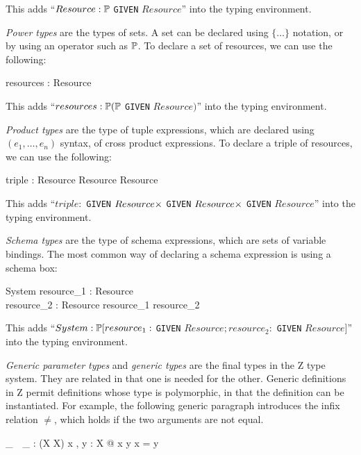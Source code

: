 This adds ``$Resource : \power$ {\tt GIVEN} $Resource$'' into the typing
environment.

{\em Power types} are the types of sets. A set can be declared using
$\{\ldots\}$ notation, or by using an operator such as $\power$. To
declare a set of resources, we can use the following:
\begin{axdef}
  resources : \power Resource
\end{axdef}

This adds ``$resources : \power (\power$ {\tt GIVEN}
$Resource)$'' into the typing environment.

{\em Product types} are the type of tuple expressions, which are
declared using $(e_1, \ldots, e_n)$ syntax, of cross product expressions. To
declare a triple of resources, we can use the following:
\begin{axdef}
   triple : Resource \cross Resource \cross Resource
\end{axdef}

This adds ``$triple : $ {\tt GIVEN}
$Resource \cross$ {\tt GIVEN} $Resource \cross$ {\tt GIVEN} $Resource$''
into the typing environment.

{\em Schema types} are the type of schema expressions, which are sets
of variable bindings. The most common way of declaring a schema
expression is using a schema box:
\begin{schema}{System}
  resource_1 : Resource\\
  resource_2 : Resource
\where
  resource_1 \neq resource_2
\end{schema}

This adds ``$System
: \power [resource_1 : $ {\tt GIVEN} $Resource; resource_2 : $ {\tt GIVEN}
$Resource]$'' into the typing environment.

{\em Generic parameter types} and {\em generic types} are the final
types in the Z type system. They are related in that one is needed for
the other. Generic definitions in Z permit definitions whose type is
polymorphic, in that the definition can be instantiated. For example,
the following generic paragraph introduces the infix relation
$\neq$, which holds if the two arguments are not equal.

\begin{gendef}[X]
  \_~\neq~\_ : \power (X \cross X)
\where
\forall x , y : X @ x \neq y \iff \lnot x = y
\end{gendef}

